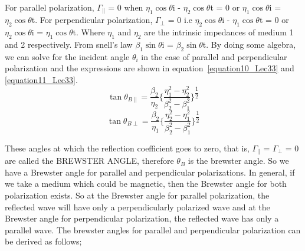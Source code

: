 For parallel polarization, $\Gamma_\parallel$ = 0 when $\eta_1\cos\theta$i - $\eta_2\cos\theta$t = 0 or $\eta_1\cos\theta$i = $\eta_2\cos\theta$t. For perpendicular polarization, $\Gamma_\perp$ = 0 i.e $\eta_2\cos\theta$i - $\eta_1\cos\theta$t = 0 or $\eta_2\cos\theta$i = $\eta_1\cos\theta$t. Where $\eta_1$ and $\eta_2$ are the intrinsic impedances of medium 1 and 2 respectively. From snell's law $\beta_1\sin\theta$i = $\beta_2\sin\theta$t. By doing  some algebra, we can solve for the incident angle $\theta_i$ in the case of parallel and perpendicular polarization and the expressions are shown in equation~\ref{equation10_Lec33} and \ref{equation11_Lec33}. 
\begin{equation}
\tan\theta_{B\parallel} = \dfrac{\beta_2}{\eta_2} \Bigg\{ \dfrac{\eta_1 ^2 - \eta_2 ^2}{\beta_2 ^2 - \beta_1 ^2} \Bigg\}^{\dfrac{1}{2}}
\label{equation10_Lec33}
\end{equation}
\begin{equation}
\tan\theta_{B\perp} = \dfrac{\beta_2}{\eta_1} \Bigg\{ \dfrac{\eta_2 ^2 - \eta_1 ^2}{\beta_2 ^2 - \beta_1 ^2} \Bigg\}^{\dfrac{1}{2}}
\label{equation11_Lec33}
\end{equation}

These angles at which the reflection coefficient goes to zero, that is, $\Gamma_\parallel$ = $\Gamma_\perp$ = 0 are called the BREWSTER ANGLE, therefore $\theta_B$ is the brewster angle. So we have a Brewster angle for parallel and perpendicular polarizations. In general, if we take a medium which could be magnetic, then the Brewster angle for both polarization exists. So at the Brewster angle for parallel polarization, the reflected wave will have only a perpendicularly polarized wave and at the Brewster angle for perpendicular polarization, the reflected wave has only a parallel wave. The brewster angles for parallel and perpendicular polarization can be derived as follows;
